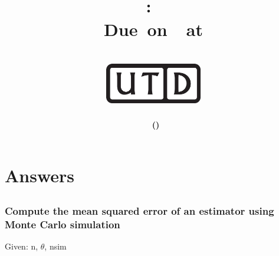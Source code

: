 \documentclass[12pt,letterpaper,titlepage,en-US]{article}
\title{
    \vspace{1in}
    \textmd{\textbf{\hmwkClassName \\\hmwkClass:\ \hmwkTitle }}\\
     \normalsize\vspace{0.1in}\small{Due\ on\ \DTMusedate{DueDate}\ at \DTMusetime{DueDate} }\\
    \vspace{0.1in}\large{\textit{\hmwkClassInstructor}}\\
    \vspace{0.5in}\includegraphics[height=2.4em]{UTD_logo_BW}\\
    \vspace{2in}
}
\author{\textbf{\hmwkAuthorName\ \footnotesize{(\hmwkAuthorNetID)}} \\ }
\date{}
\begin{document}
\maketitle


\tableofcontents

\pagebreak
{}


\section{Answers}

\subsection{}

\subsubsection{Compute the mean squared error of an estimator using Monte Carlo simulation}
Given: n, $\theta$, nsim
\end{document}
